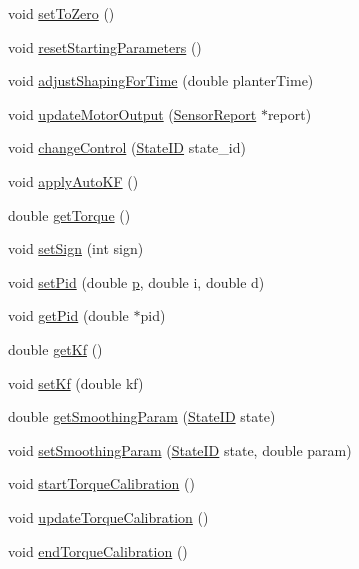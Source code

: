 \begin{DoxyCompactItemize}
void \hyperlink{classJoint_aa6964b1dec64a9c76b7a5a082f700493}{set\+To\+Zero} ()
\item 
void \hyperlink{classJoint_a29e0a32427976e087e35ea881fb58449}{reset\+Starting\+Parameters} ()
\item 
void \hyperlink{classJoint_ad39647a7d64b22dac562fa977344ecac}{adjust\+Shaping\+For\+Time} (double planter\+Time)
\item 
void \hyperlink{classJoint_abed0afe032168f8f554c78e7f82a5394}{update\+Motor\+Output} (\hyperlink{classSensorReport}{Sensor\+Report} $\ast$report)
\item 
void \hyperlink{classJoint_a6a4d31e980f795d5b951323ac5fd0626}{change\+Control} (\hyperlink{States_8hpp_a26aafbeccd8f356b39e1809f1ab9cfdc}{State\+ID} state\+\_\+id)
\item 
void \hyperlink{classJoint_a012a6a79e4ef4951f033b8bdbe49e93d}{apply\+Auto\+KF} ()
\item 
double \hyperlink{classJoint_a75111a7b8091c6ca5f0788704a7c1b1c}{get\+Torque} ()
\item 
void \hyperlink{classJoint_af1397d8f10d7e4509b14d5291d1c1d11}{set\+Sign} (int sign)
\item 
void \hyperlink{classJoint_ae6a96eb43fcdf599bf62fed7f8a09aa2}{set\+Pid} (double \hyperlink{Parameters_8hpp_ad1ae3be971981842496c18dabdd2e4c1}{p}, double i, double d)
\item 
void \hyperlink{classJoint_a1b138e33fe58097b42f43ade71bf8f17}{get\+Pid} (double $\ast$pid)
\item 
double \hyperlink{classJoint_a6dc498ec465f965d87533a34ee9b62d4}{get\+Kf} ()
\item 
void \hyperlink{classJoint_a99cbfdb591d588f8f8f018385f45a52c}{set\+Kf} (double kf)
\item 
double \hyperlink{classJoint_ac65cae6a80c68689ecc1e1c23c1f0aca}{get\+Smoothing\+Param} (\hyperlink{States_8hpp_a26aafbeccd8f356b39e1809f1ab9cfdc}{State\+ID} state)
\item 
void \hyperlink{classJoint_a582b21a00df5a1a5079b3bb8ba8e8af0}{set\+Smoothing\+Param} (\hyperlink{States_8hpp_a26aafbeccd8f356b39e1809f1ab9cfdc}{State\+ID} state, double param)
\item 
void \hyperlink{classJoint_ab8b007027b56b90bdf0488926f63ddf6}{start\+Torque\+Calibration} ()
\item 
void \hyperlink{classJoint_a393c16f6d5aad78c8447b275c46ef201}{update\+Torque\+Calibration} ()
\item 
void \hyperlink{classJoint_a4a9f131afc5991affa8e05e3928bf4d8}{end\+Torque\+Calibration} ()
\end{DoxyCompactItemize}


